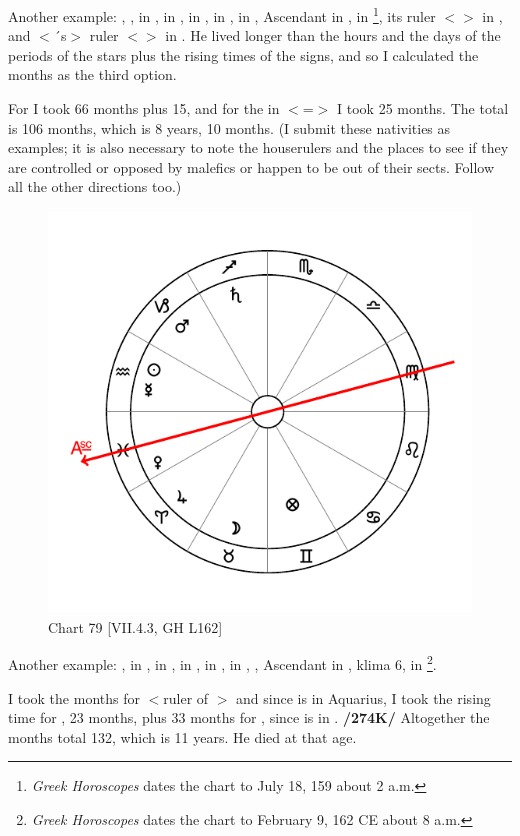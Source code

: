 Another example: \Sun, \Venus, \Mercury\xspace in \Cancer, \Moon\xspace in \Capricorn, \Saturn\xspace in \Scorpio, \Jupiter\xspace in \Aquarius, \Mars\xspace in \Leo, Ascendant in \Taurus, \Fortune\xspace in \Scorpio\footnote{\textit{Greek Horoscopes} dates the chart to July 18, 159 about 2 a.m.}, its ruler $<$\Mars$>$ in \Leo, and $<$\Leo´s$>$ ruler $<$\Sun$>$ in \Cancer. He lived longer than the hours and the days of the periods of the stars plus the rising times of the signs, and so I calculated the months as the third option. 

For \Mars\xspace I took 66 months plus 15, and for the \Sun\xspace in \Cancer $<$=\Moon$>$ I took 25 months. The total is 106 months, which is 8 years, 10 months. (I submit these nativities as examples; it is also necessary to note the houserulers and the places to see
if they are controlled or opposed by malefics or happen to be out of their sects. Follow all the other directions too.)

\newpage
\begin{figure}
\centering
\vspace{-10pt}
\includegraphics[width=.68\textwidth]{charts/7_4_3}
\caption{Chart 79 [VII.4.3, GH L162]}
\label{fig:chart79}
\end{figure} 

Another example: \Sun, \Mercury\xspace in \Aquarius, \Moon\xspace in \Taurus, \Saturn\xspace in \Sagittarius, \Jupiter\xspace in \Aries,
\Mars\xspace in \Capricorn, \Venus, Ascendant in \Pisces, klima 6, \Fortune\xspace in \Gemini\footnote{\textit{Greek Horoscopes} dates the chart to February 9, 162 CE about 8 a.m.}. 

I took the months for \Mercury\xspace $<$ruler of \Gemini$>$ and since \Mercury\xspace is in Aquarius, I took the rising time for \Aquarius, 23 months, plus 33 months for \Sagittarius, since \Saturn\xspace is in \Sagittarius. \textbf{/274K/} Altogether the months total 132, which is 11 years. He died at that age. 

